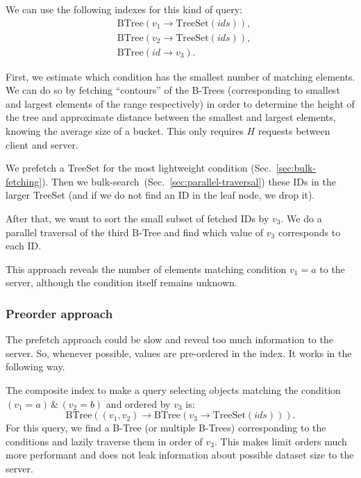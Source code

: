 \documentclass[notitlepage,longbibliography]{revtex4-1}
\begin{document}
We can use the following indexes for this kind of query:
\begin{align*}
    & \mbox{BTree}(v_1 \rightarrow \mbox{TreeSet}(ids)),\\
    & \mbox{BTree}(v_2 \rightarrow \mbox{TreeSet}(ids)),\\
    & \mbox{BTree}(id \rightarrow v_3).
\end{align*}

First, we estimate which condition has the smallest number of matching elements.
We can do so by fetching ``contours'' of the B-Trees (corresponding to smallest and largest elements of the range respectively) in order to determine the height of the tree and approximate distance between the smallest and largest elements, knowing the average size of a bucket. This only requires $H$ requests between client and server.

We prefetch a TreeSet for the most lightweight condition (Sec.~\ref{sec:bulk-fetching}).
Then we bulk-search~(Sec.~\ref{sec:parallel-traversal}) these IDs in the larger TreeSet (and if we do not find an ID in the leaf node, we drop it).

After that, we want to sort the small subset of fetched IDs by $v_3$.
We do a parallel traversal of the third B-Tree and find which value of $v_3$ corresponds to each ID.

This approach reveals the number of elements matching condition $v_1=a$ to the server, although the condition itself remains unknown.

\subsubsection{Preorder approach}

The prefetch approach could be slow and reveal too much information to the server.
So, whenever possible, values are pre-ordered in the index.
It works in the following way.

The composite index to make a query selecting objects matching the condition $(v_1 = a) \,\&\, (v_2 = b)$ and ordered by $v_3$ is:
\begin{equation*}
    \mbox{BTree}((v_1, v_2) \rightarrow \mbox{BTree}(v_3 \rightarrow \mbox{TreeSet}(ids))).
\end{equation*}
For this query, we find a B-Tree (or multiple B-Trees) corresponding to the conditions and lazily traverse them in order of $v_3$.
This makes limit orders much more performant and does not leak information about possible dataset size to the server.
\end{document}
